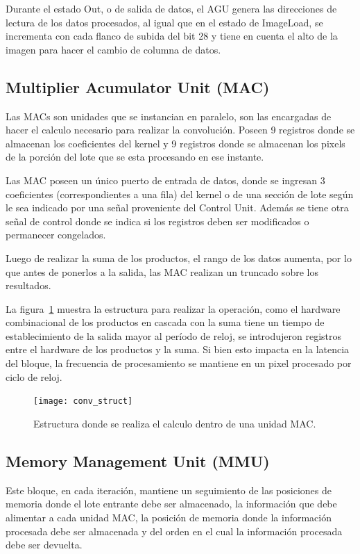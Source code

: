 Durante el estado Out, o de salida de datos, el AGU genera las direcciones de
lectura de los datos procesados, al igual que en el estado de ImageLoad, se
incrementa con cada flanco de subida del bit 28 y tiene en cuenta el alto de la
imagen para hacer el cambio de columna de datos.

\subsection{Multiplier Acumulator Unit (MAC)}

Las MACs son unidades que se instancian en paralelo, son las encargadas de
hacer el calculo necesario para realizar la convolución. Poseen 9 registros
donde se almacenan los coeficientes del kernel y 9 registros donde se almacenan
los pixels de la porción del lote que se esta procesando en ese instante.

Las MAC poseen un único puerto de entrada de datos, donde se ingresan 3
coeficientes (correspondientes a una fila) del kernel o de una sección de lote
según le sea indicado por una señal proveniente del Control Unit. Además se
tiene otra señal de control donde se indica si los registros deben ser
modificados o permanecer congelados.

Luego de realizar la suma de los productos, el rango de los datos aumenta, por
lo que antes de ponerlos a la salida, las MAC realizan un truncado sobre los resultados.

La figura~\ref{conv_struct} muestra la estructura para realizar la operación,
como el hardware combinacional de los productos en cascada con la suma tiene un
tiempo de establecimiento de la salida mayor al período de reloj, se
introdujeron registros entre el hardware de los productos y la suma. Si bien
esto impacta en la latencia del bloque, la frecuencia de procesamiento se
mantiene en un pixel procesado por ciclo de reloj. 

\begin{figure}
\centering
\texttt{[image: conv\_struct]}
\caption{Estructura donde se realiza el calculo dentro de una unidad MAC.}
\label{conv_struct}
\end{figure}

\subsection{Memory Management Unit (MMU)}

Este bloque, en cada iteración, mantiene un seguimiento de las posiciones de
memoria donde el lote entrante debe ser almacenado, la información que debe
alimentar a cada unidad MAC, la posición de memoria donde la información
procesada debe ser almacenada y del orden en el cual la información procesada
debe ser devuelta.

